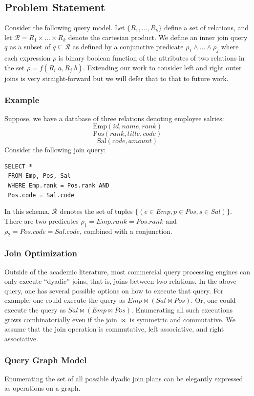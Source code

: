 \subsection*{Problem Statement}
Consider the following query model.
Let $\{R_1,...,R_k\}$ define a set of relations, and let $\mathcal{R} = R_1 \times ... \times R_k$ denote the cartesian product.
We define an inner join query $q$ as a subset of $q \subseteq \mathcal{R}$ as defined by a conjunctive predicate $\rho_1 \wedge ... \wedge \rho_j$ where each expression $\rho$ is binary boolean function of the attributes of two relations in the set $\rho = f(R_i.a, R_j.b)$.
Extending our work to consider left and right outer joins is very straight-forward but we will defer that to that to future work.

\subsubsection{Example}
Suppose, we have a database of three relations denoting employee salries:
\[
\text{Emp}(id, name, rank)
\]
\[
\text{Pos}(rank, title, code)
\]
\[
\text{Sal}(code, amount)
\]
Consider the following join query:
\begin{lstlisting}
SELECT *
 FROM Emp, Pos, Sal
 WHERE Emp.rank = Pos.rank AND
 Pos.code = Sal.code
\end{lstlisting}
In this schema, $\mathcal{R}$ denotes the set of tuples $\{(e \in Emp, p \in Pos, s \in Sal)\}$. There are two predicates $\rho_1 = Emp.rank = Pos.rank$ and $\rho_2 = Pos.code = Sal.code$, combined with a conjunction. 

\subsubsection{Join Optimization}
Outside of the academic literature, most commercial query processing engines can only execute ``dyadic'' joins, that is, joins between two relations. In the above query, one has several possible options on how to execute that query. For example, one could execute the query as $Emp \bowtie (Sal \bowtie Pos)$. Or, one could execute the query as $Sal \bowtie (Emp \bowtie Pos)$. Enumerating all such executions grows combinatorially even if the join $\bowtie$ is symmetric and commutative.
We assume that the join operation is commutative, left associative, and right associative.

\subsubsection{Query Graph Model}
Enumerating the set of all possible dyadic join plans can be elegantly expressed as operations on a graph.

